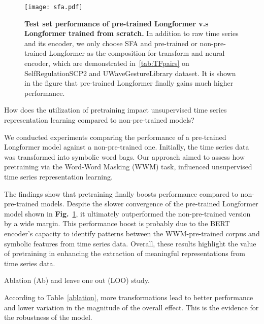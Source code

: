 \begin{figure}
    \centering
    \texttt{[image: sfa.pdf]}\label{img:sfa}
    \caption{\textbf{Test set performance of pre-trained Longformer v.s Longformer trained from scratch.} In addition to raw time series and its encoder, we only choose SFA and pre-trained or non-pre-trained Longformer as the composition for transform and neural encoder, which are demonstrated in~\ref{tab:TFpairs} on SelfRegulationSCP2 and UWaveGestureLibrary dataset. It is shown in the figure that pre-trained Longformer finally gains much higher performance.}
    \label{fig:sfa}
\end{figure}

\begin{researchq}
How does the utilization of pretraining impact unsupervised time series representation learning compared to non-pre-trained models?
\end{researchq}

We conducted experiments comparing the performance of a pre-trained Longformer model against a non-pre-trained one. Initially, the time series data was transformed into symbolic word bags. Our approach aimed to assess how pretraining via the Word-Word Masking (WWM) task, influenced unsupervised time series representation learning.

The findings show that pretraining finally boosts performance compared to non-pre-trained models. Despite the slower convergence of the pre-trained Longformer model shown in \textbf{Fig.}~\ref{fig:sfa}, it ultimately outperformed the non-pre-trained version by a wide margin. This performance boost is probably due to the BERT encoder's capacity to identify patterns between the WWM-pre-trained corpus and symbolic features from time series data. Overall, these results highlight the value of pretraining in enhancing the extraction of meaningful representations from time series data.


\begin{researchq}
    Ablation (Ab) and leave one out (LOO) study.
\end{researchq}
According to Table~\ref{ablation}, more transformations lead to better performance and lower variation in the magnitude of the overall effect. This is the evidence for the robustness of the model.

